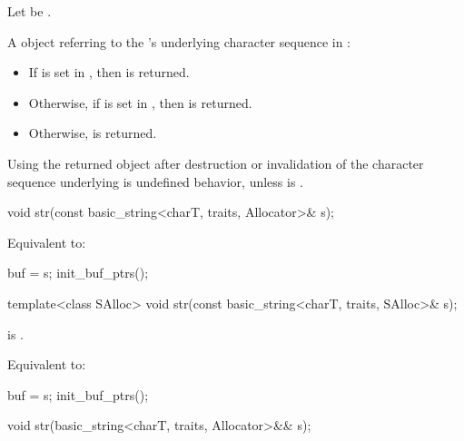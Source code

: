 \begin{itemdescr}
\pnum
Let  be .

\pnum
\returns
A  object referring to
the 's underlying character sequence in :
\begin{itemize}
\item If  is set in ,
  then  is returned.
\item Otherwise, if  is set in ,
  then  is returned.
\item Otherwise,  is returned.
\end{itemize}

\pnum
\begin{note}
Using the returned  object after
destruction or invalidation of the character sequence underlying 
is undefined behavior, unless  is .
\end{note}
\end{itemdescr}

%
\begin{itemdecl}
void str(const basic_string<charT, traits, Allocator>& s);
\end{itemdecl}

\begin{itemdescr}
\pnum
\effects
Equivalent to:
\begin{codeblock}
buf = s;
init_buf_ptrs();
\end{codeblock}
\end{itemdescr}

%
\begin{itemdecl}
template<class SAlloc>
  void str(const basic_string<charT, traits, SAlloc>& s);
\end{itemdecl}

\begin{itemdescr}
\pnum
\constraints {} is .

\pnum
\effects
Equivalent to:
\begin{codeblock}
buf = s;
init_buf_ptrs();
\end{codeblock}
\end{itemdescr}

%
\begin{itemdecl}
void str(basic_string<charT, traits, Allocator>&& s);
\end{itemdecl}


